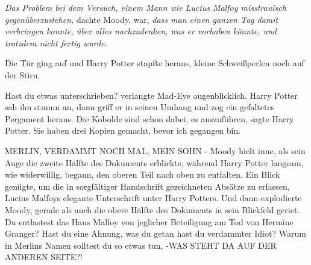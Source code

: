 \emph{Das Problem bei dem Versuch, einem Mann wie Lucius Malfoy misstrauisch
gegenüberzustehen,} dachte Moody, war, \emph{dass man einen ganzen Tag damit
verbringen konnte, über alles nachzudenken, was er vorhaben könnte, und trotzdem
nicht fertig wurde.}

Die Tür ging auf und Harry Potter stapfte heraus, kleine Schweißperlen noch auf
der Stirn.

\glqq{}Hast du etwas unterschrieben?\grqq{} verlangte Mad-Eye augenblicklich.
Harry Potter sah ihn stumm an, dann griff er in seinen Umhang und zog ein
gefaltetes Pergament heraus. \glqq{}Die Kobolde sind schon dabei, es
auszuführen\grqq{}, sagte Harry Potter. \glqq{}Sie haben drei Kopien gemacht,
bevor ich gegangen bin.\grqq{}

\glqq{}MERLIN, VERDAMMT NOCH MAL, MEIN SOHN -\grqq{} Moody hielt inne, als sein
Auge die zweite Hälfte des Dokuments erblickte, während Harry Potter langsam,
wie widerwillig, begann, den oberen Teil nach oben zu entfalten. Ein Blick
genügte, um die in sorgfältiger Handschrift gezeichneten Absätze zu erfassen,
Lucius Malfoys elegante Unterschrift unter Harry Potters. Und dann explodierte
Moody, gerade als auch die obere Hälfte des Dokuments in sein Blickfeld geriet.
\glqq{}Du entlastest das Haus Malfoy von jeglicher Beteiligung am Tod von Hermine
Granger? Hast du eine Ahnung, was du getan hast du verdammter Idiot? Warum in
Merlins Namen solltest du so etwas tun, -WAS STEHT DA AUF DER ANDEREN SEITE?!\grqq{}

